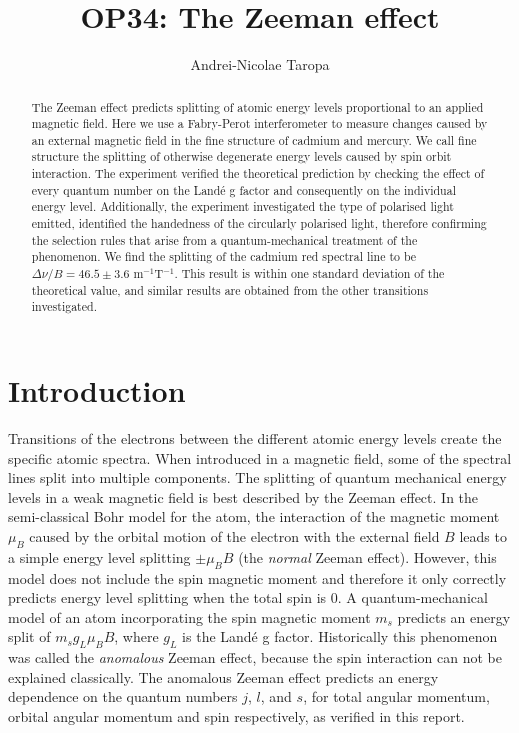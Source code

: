 \documentclass[11pt]{article}
\title{OP34: The Zeeman effect}
\author{Andrei-Nicolae Taropa}
\begin{document}
\maketitle


\begin{abstract}
The Zeeman effect predicts splitting of atomic energy levels proportional to an applied magnetic field. Here we use a Fabry-Perot interferometer to measure changes caused by an external magnetic field in the fine structure of cadmium and mercury. We call fine structure the splitting of otherwise degenerate energy levels caused by spin orbit interaction. The experiment verified the theoretical prediction by checking the effect of every quantum number on the Landé g factor and consequently on the individual energy level. Additionally, the experiment investigated the type of polarised light emitted, identified the handedness of the circularly polarised light, therefore confirming the selection rules that arise from a quantum-mechanical treatment of the phenomenon. We find the splitting of the cadmium red spectral line to be $\Delta \nu / B = 46.5 \pm 3.6$ m$^{-1}$T$^{-1}$. This result is within one standard deviation of the theoretical value, and similar results are obtained from the other transitions investigated. 

\end{abstract}


\section{Introduction}
Transitions of the electrons between the different atomic energy levels create the specific atomic spectra. When introduced in a magnetic field, some of the spectral lines split into multiple components. 
The splitting of quantum mechanical energy levels in a weak magnetic field is best described by the Zeeman effect. 
In the semi-classical Bohr model for the atom, the interaction of the magnetic moment $\mu_B$ caused by the orbital motion of the electron with the external field $B$ leads to a simple energy level splitting $\pm \mu_B B$ (the \emph{normal} Zeeman effect). 
However, this model does not include the spin magnetic moment and therefore it only correctly predicts energy level splitting when the total spin is $0$. A quantum-mechanical model of an atom incorporating the spin magnetic moment $m_s$ predicts an energy split of $m_s g_L \mu_B B$, where $g_L$ is the Landé g factor. Historically this phenomenon was called the \emph{anomalous} Zeeman effect, because the spin interaction can not be explained classically. The anomalous Zeeman effect predicts an energy dependence on the quantum numbers $j$, $l$, and $s$, for total angular momentum, orbital angular momentum and spin respectively, as verified in this report.
\end{document}
